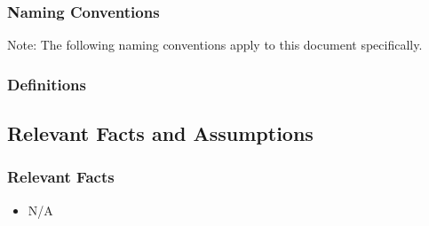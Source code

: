 \documentclass [11pt]{article}
\begin{document}
\subsubsection{Naming Conventions}
Note: The following naming conventions apply to this document specifically. 
%
%
%
%
%
%
%

\subsubsection{Definitions}

\subsection{Relevant Facts and Assumptions} 

\subsubsection{Relevant Facts}
\begin{itemize}
	\item N/A
\end{itemize}
\end{document}
